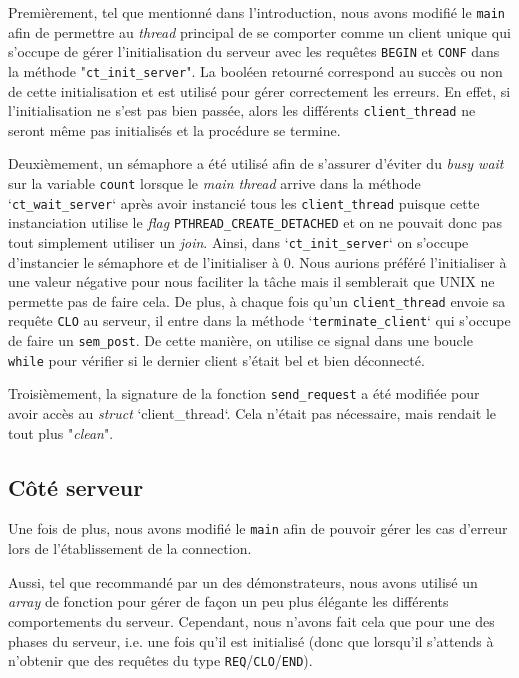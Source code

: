 \documentclass[11pt]{article}
\begin{document}
Premièrement, tel que mentionné dans l'introduction, nous avons modifié le \texttt{main} afin de permettre au \textit{thread} principal de se comporter comme un client unique qui s'occupe de gérer l'initialisation du serveur avec les requêtes \texttt{BEGIN} et \texttt{CONF} dans la méthode "\texttt{ct\_init\_server}". La booléen retourné correspond au succès ou non de cette initialisation et est utilisé pour gérer correctement les erreurs. En effet, si l'initialisation ne s'est pas bien passée, alors les différents \texttt{client\_thread} ne seront même pas initialisés et la procédure se termine.

Deuxièmement, un sémaphore a été utilisé afin de s'assurer d'éviter du \textit{busy wait} sur la variable \texttt{count} lorsque le \textit{main thread} arrive dans la méthode `\texttt{ct\_wait\_server}` après avoir instancié tous les \texttt{client\_thread} puisque cette instanciation utilise le \textit{flag} \texttt{PTHREAD\_CREATE\_DETACHED} et on ne pouvait donc pas tout simplement utiliser un \textit{join}. Ainsi, dans `\texttt{ct\_init\_server}` on s'occupe d'instancier le sémaphore et de l'initialiser à 0. Nous aurions préféré l'initialiser à une valeur négative pour nous faciliter la tâche mais il semblerait que UNIX ne permette pas de faire cela. De plus, à chaque fois qu'un \texttt{client\_thread} envoie sa requête \texttt{CLO} au serveur, il entre dans la méthode `\texttt{terminate\_client}` qui s'occupe de faire un \texttt{sem\_post}. De cette manière, on utilise ce signal dans une boucle \texttt{while} pour vérifier si le dernier client s'était bel et bien déconnecté.

Troisièmement, la signature de la fonction \texttt{send\_request} a été modifiée pour avoir accès au \textit{struct} `client\_thread`. Cela n'était pas nécessaire, mais rendait le tout plus "\textit{clean}".


\subsection{Côté serveur}

Une fois de plus, nous avons modifié le \texttt{main} afin de pouvoir gérer les cas d'erreur lors de l'établissement de la connection.

Aussi, tel que recommandé par un des démonstrateurs, nous avons utilisé un \textit{array} de fonction pour gérer de façon un peu plus élégante les différents comportements du serveur. Cependant, nous n'avons fait cela que pour une des phases du serveur, i.e. une fois qu'il est initialisé (donc que lorsqu'il s'attends à n'obtenir que des requêtes du type \texttt{REQ}/\texttt{CLO}/\texttt{END}).
\end{document}
